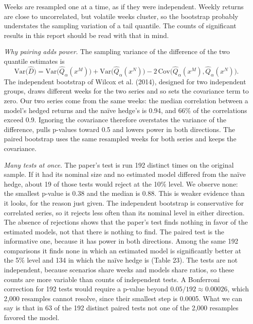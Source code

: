 \documentclass[11pt,letterpaper]{article}
\begin{document}
Weeks are resampled one at a time, as if they were independent. Weekly returns are close to uncorrelated, but volatile weeks cluster, so the bootstrap probably understates the sampling variation of a tail quantile. The counts of significant results in this report should be read with that in mind.

\textit{Why pairing adds power.} The sampling variance of the difference of the two quantile estimates is
\begin{equation}
\mathrm{Var}\big(\hat D\big) = \mathrm{Var}\big(\hat Q_\alpha(x^M)\big) + \mathrm{Var}\big(\hat Q_\alpha(x^N)\big) - 2\,\mathrm{Cov}\big(\hat Q_\alpha(x^M), \hat Q_\alpha(x^N)\big).
\end{equation}
The independent bootstrap of Wilcox et al. (2014), designed for two independent groups, draws different weeks for the two series and so sets the covariance term to zero. Our two series come from the same weeks: the median correlation between a model's hedged returns and the naïve hedge's is 0.94, and 66\% of the correlations exceed 0.9. Ignoring the covariance therefore overstates the variance of the difference, pulls p-values toward 0.5 and lowers power in both directions. The paired bootstrap uses the same resampled weeks for both series and keeps the covariance.

\textit{Many tests at once.} The paper's test is run 192 distinct times on the original sample. If it had its nominal size and no estimated model differed from the naïve hedge, about 19 of those tests would reject at the 10\% level. We observe none: the smallest p-value is 0.38 and the median is 0.88. This is weaker evidence than it looks, for the reason just given. The independent bootstrap is conservative for correlated series, so it rejects less often than its nominal level in either direction. The absence of rejections shows that the paper's test finds nothing in favor of the estimated models, not that there is nothing to find. The paired test is the informative one, because it has power in both directions. Among the same 192 comparisons it finds none in which an estimated model is significantly better at the 5\% level and 134 in which the naïve hedge is (Table 23). The tests are not independent, because scenarios share weeks and models share ratios, so these counts are more variable than counts of independent tests. A Bonferroni correction for 192 tests would require a p-value beyond $0.05/192 \approx 0.00026$, which 2,000 resamples cannot resolve, since their smallest step is 0.0005. What we can say is that in 63 of the 192 distinct paired tests not one of the 2,000 resamples favored the model.
\end{document}

